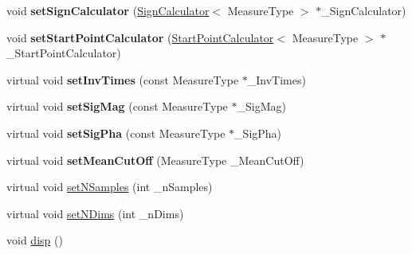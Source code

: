 \begin{DoxyCompactItemize}
\item 
\hypertarget{class_ox_1_1_calculator_t1_ae043a486f1db48e46a3e011e4a3d76b3}{void {\bfseries set\-Sign\-Calculator} (\hyperlink{class_ox_1_1_sign_calculator}{Sign\-Calculator}$<$ Measure\-Type $>$ $\ast$\-\_\-\-Sign\-Calculator)}\label{class_ox_1_1_calculator_t1_ae043a486f1db48e46a3e011e4a3d76b3}

\item 
\hypertarget{class_ox_1_1_calculator_t1_a89628a47da5bf7baddcd87f687613096}{void {\bfseries set\-Start\-Point\-Calculator} (\hyperlink{class_ox_1_1_start_point_calculator}{Start\-Point\-Calculator}$<$ Measure\-Type $>$ $\ast$\-\_\-\-Start\-Point\-Calculator)}\label{class_ox_1_1_calculator_t1_a89628a47da5bf7baddcd87f687613096}

\item 
\hypertarget{class_ox_1_1_calculator_t1_a102f4865fc2424e6f30bcbd5bf3580f3}{virtual void {\bfseries set\-Inv\-Times} (const Measure\-Type $\ast$\-\_\-\-Inv\-Times)}\label{class_ox_1_1_calculator_t1_a102f4865fc2424e6f30bcbd5bf3580f3}

\item 
\hypertarget{class_ox_1_1_calculator_t1_a4d0327b2105ef6b99cfacb5d37075a5a}{virtual void {\bfseries set\-Sig\-Mag} (const Measure\-Type $\ast$\-\_\-\-Sig\-Mag)}\label{class_ox_1_1_calculator_t1_a4d0327b2105ef6b99cfacb5d37075a5a}

\item 
\hypertarget{class_ox_1_1_calculator_t1_a81b313cfacfd8880e39c0e2cd87c912c}{virtual void {\bfseries set\-Sig\-Pha} (const Measure\-Type $\ast$\-\_\-\-Sig\-Pha)}\label{class_ox_1_1_calculator_t1_a81b313cfacfd8880e39c0e2cd87c912c}

\item 
\hypertarget{class_ox_1_1_calculator_t1_a08da2ecf1ea83b83854fbe09a03de839}{virtual void {\bfseries set\-Mean\-Cut\-Off} (Measure\-Type \-\_\-\-Mean\-Cut\-Off)}\label{class_ox_1_1_calculator_t1_a08da2ecf1ea83b83854fbe09a03de839}

\item 
virtual void \hyperlink{class_ox_1_1_calculator_t1_af5d84e582c3793ebe168f24245f04de1}{set\-N\-Samples} (int \-\_\-n\-Samples)
\item 
virtual void \hyperlink{class_ox_1_1_calculator_t1_abe8decf5aba8ba0de2b6ca76ec9c1386}{set\-N\-Dims} (int \-\_\-n\-Dims)
\item 
\hypertarget{class_ox_1_1_calculator_t1_ab820a5163966ce07d7be7f323ead23ae}{void \hyperlink{class_ox_1_1_calculator_t1_ab820a5163966ce07d7be7f323ead23ae}{disp} ()}\label{class_ox_1_1_calculator_t1_ab820a5163966ce07d7be7f323ead23ae}


\end{DoxyCompactItemize}

